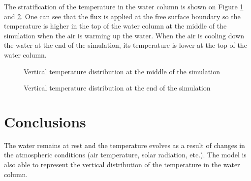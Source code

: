 The stratification of the temperature in the water column is shown on Figure \ref{fig:temp1} and \ref{fig:temp2}. One can see that the flux is applied at the free surface boundary so the temperature is higher in the top of the water column at the middle of the simulation when the air is warming up the water. When the air is cooling down the water at the end of the simulation, its temperature is lower at the top of the water column.

\begin{figure}[H]
    \begin{center}
    \end{center}
    \caption{Vertical temperature distribution at the middle of the simulation}
    \label{fig:temp1}
\end{figure}

\begin{figure}[H]
    \begin{center}
    \end{center}
    \caption{Vertical temperature distribution at the end of the simulation}
    \label{fig:temp2}
\end{figure}

\section{Conclusions}

The water remains at rest and the temperature evolves as a result of changes in the atmospheric conditions (air temperature, solar radiation, etc.). The model is also able to represent the vertical distribution of the temperature in the water column.


\renewcommand{\labelitemi}{\textbullet}
